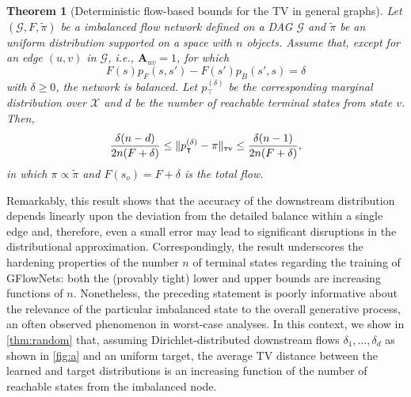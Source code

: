 \documentclass{article}
\theoremstyle{plain}
\newtheorem{theorem}{Theorem}[section]
\theoremstyle{definition}
\theoremstyle{remark}
\theoremstyle{remark}
\begin{document}
\begin{theorem}[Deterministic flow-based bounds for the TV in general graphs] \label{thm:wca} 
    Let $(\mathcal{G}, F, \tilde{\pi})$ be a imbalanced flow network defined on a DAG $\mathcal{G}$ and $\tilde{\pi}$ be an uniform distribution supported on a space with $n$ objects. Assume that, except for an edge $(u, v)$ in $\mathcal{G}$, i.e., $\mathbf{A}_{uv} = 1$, for which  
    \begin{equation}
        F(s) p_{F}(s, s') - F(s') p_{B}(s', s) = \delta 
    \end{equation}
    with $\delta \ge 0$, the network is balanced. Let $p_{\intercal}^{(\delta)}$ be the corresponding marginal distribution over $\mathcal{X}$ and $d$ be the number of reachable terminal states from state $v$. Then, 
    \begin{equation}
        \frac{\delta (n - d)}{2n (F + \delta)} \le \|p_{\intercal}^{(\delta)} - \pi\|_{\scaleto{\textbf{TV}}{3pt}} \le \frac{\delta (n - 1)}{2n (F + \delta)}, 
    \end{equation}
    in which $\pi \propto \tilde{\pi}$ and $F(s_{o}) = F + \delta$ is the total flow. 
\end{theorem}

Remarkably, this result shows that the accuracy of the downstream distribution depends linearly upon the deviation from the detailed balance within a single edge and, therefore, even a small error may lead to significant disruptions in the distributional approximation. Correspondingly, the result underscores the hardening properties of the number $n$ of terminal states regarding the training of GFlowNets: both the (provably tight) lower and upper bounds are increasing functions of $n$. Nonetheless, the preceding statement is poorly informative about the relevance of the particular imbalanced state to the overall generative process, an often observed phenomenon in worst-case analyses. In this context, we show in \autoref{thm:random} that, assuming Dirichlet-distributed downstream flows $\delta_{1}, \dots, \delta_{d}$ as shown in \autoref{fig:a} and an uniform target, the average TV distance between the learned and target distributions is an increasing function of the number of reachable states from the imbalanced node.  
\end{document}
